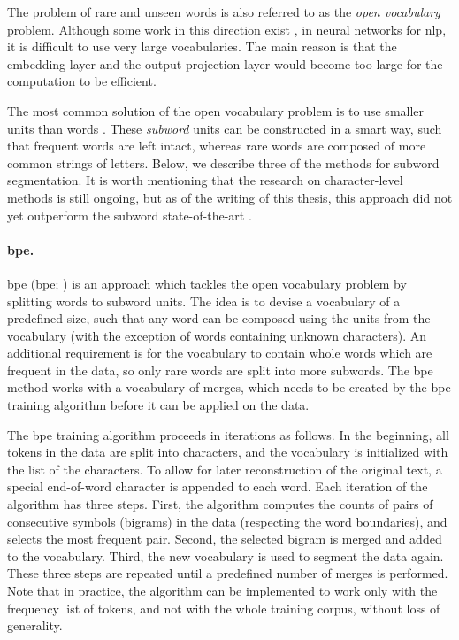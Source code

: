 The problem of rare and unseen words is also referred to as the \emph{open
  vocabulary} problem. Although some work in this direction exist
\citep{jean-etal-2015-using}, in neural networks for \ac{nlp}, it is difficult
to use very large vocabularies. The main reason is that the embedding layer and
the output projection layer would become too large for the computation to be
efficient.

The most common solution of the open vocabulary problem is to use smaller units
than words \citep{sennrich-etal-2016-neural}. These \emph{subword} units can be
constructed in a smart way, such that frequent words are left intact, whereas
rare words are composed of more common strings of letters. Below, we describe
three of the methods for subword segmentation. It is worth mentioning that the
research on character-level methods is still ongoing, but as of the writing of
this thesis, this approach did not yet outperform the subword state-of-the-art
\citep{chung-etal-2016-character,lee-etal-2017-fully,gao-etal-2020-character}.

\paragraph{\acs{bpe}.}  \Acl{bpe}  (\acs{bpe};
\citealp{sennrich-etal-2016-neural}) is an approach which tackles the open
vocabulary problem by splitting words to subword units.  The idea is to devise
a vocabulary of a predefined size, such that any word can be composed using the
units from the vocabulary (with the exception of words containing unknown
characters). An additional requirement is for the vocabulary to contain whole
words which are frequent in the data, so only rare words are split into more
subwords. The \ac{bpe} method works with a vocabulary of merges, which needs to
be created by the \ac{bpe} training algorithm before it can be applied on the
data.

The \ac{bpe} training algorithm proceeds in iterations as follows. In the
beginning, all tokens in the data are split into characters, and the vocabulary
is initialized with the list of the characters. To allow for later
reconstruction of the original text, a special end-of-word character is
appended to each word.  Each iteration of the algorithm has three steps. First,
the algorithm computes the counts of pairs of consecutive symbols (bigrams) in
the data (respecting the word boundaries), and selects the most frequent
pair. Second, the selected bigram is merged and added to the vocabulary. Third,
the new vocabulary is used to segment the data again. These three steps are
repeated until a predefined number of merges is performed.  Note that in
practice, the algorithm can be implemented to work only with the frequency list
of tokens, and not with the whole training corpus, without loss of generality.

